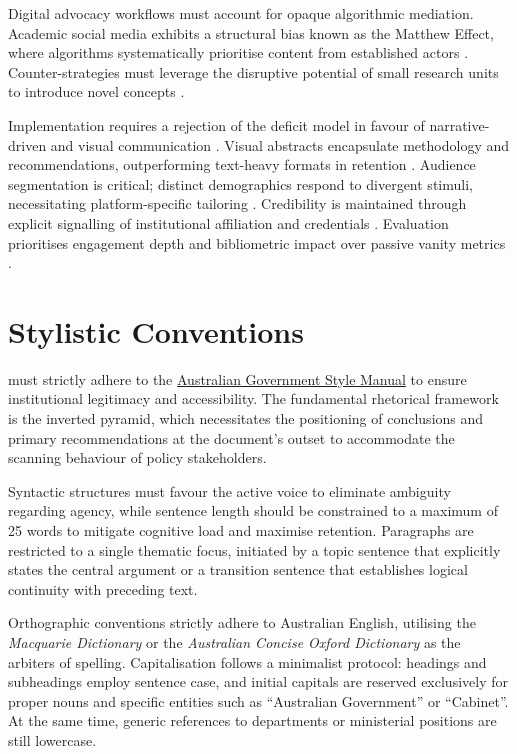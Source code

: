 \documentclass[12pt, a4paper]{article}
\begin{document}
Digital advocacy workflows must account for opaque algorithmic mediation. Academic social media exhibits a structural bias known as the Matthew Effect, where algorithms systematically prioritise content from established actors \citep{monteiro-krebs_trespassing_2021}. Counter-strategies must leverage the disruptive potential of small research units to introduce novel concepts \citep{wu_large_2019}.

Implementation requires a rejection of the deficit model in favour of narrative-driven and visual communication \citep{portman_how_2025}. Visual abstracts encapsulate methodology and recommendations, outperforming text-heavy formats in retention \citep{portman_how_2025}. Audience segmentation is critical; distinct demographics respond to divergent stimuli, necessitating platform-specific tailoring \citep{zickar_using_2020}. Credibility is maintained through explicit signalling of institutional affiliation and credentials \citep{portman_how_2025}. Evaluation prioritises engagement depth and bibliometric impact over passive vanity metrics \citep{monteiro-krebs_trespassing_2021, klar_using_2020}.

\section{Stylistic Conventions}
 must strictly adhere to the \href{https://www.stylemanual.gov.au/}{Australian Government Style Manual} to ensure institutional legitimacy and accessibility. The fundamental rhetorical framework is the inverted pyramid, which necessitates the positioning of conclusions and primary recommendations at the document's outset to accommodate the scanning behaviour of policy stakeholders.

Syntactic structures must favour the active voice to eliminate ambiguity regarding agency, while sentence length should be constrained to a maximum of 25 words to mitigate cognitive load and maximise retention. Paragraphs are restricted to a single thematic focus, initiated by a topic sentence that explicitly states the central argument or a transition sentence that establishes logical continuity with preceding text.

Orthographic conventions strictly adhere to Australian English, utilising the \textit{Macquarie Dictionary} or the \textit{Australian Concise Oxford Dictionary} as the arbiters of spelling. Capitalisation follows a minimalist protocol: headings and subheadings employ sentence case, and initial capitals are reserved exclusively for proper nouns and specific entities such as ``Australian Government'' or ``Cabinet''. At the same time, generic references to departments or ministerial positions are still lowercase.
\end{document}
